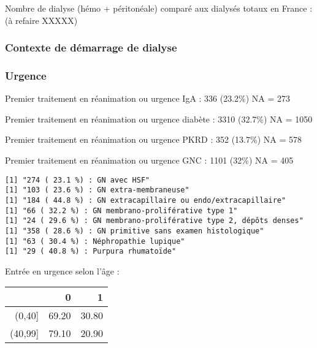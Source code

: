 \documentclass[11pt,a4paper]{article}\usepackage[]{graphicx}\usepackage[]{color}
\makeatletter
\newenvironment{kframe}{%
 \def\at@end@of@kframe{}%
 \ifinner\ifhmode%
  \def\at@end@of@kframe{\end{minipage}}%
  \begin{minipage}{\columnwidth}%
 \fi\fi%
 \def\FrameCommand##1{\hskip\@totalleftmargin \hskip-\fboxsep
 \colorbox{shadecolor}{##1}\hskip-\fboxsep
     \hskip-\linewidth \hskip-\@totalleftmargin \hskip\columnwidth}%
 \MakeFramed {\advance\hsize-\width
   \@totalleftmargin\z@ \linewidth\hsize
   \@setminipage}}%
 {\par\unskip\endMakeFramed%
 \at@end@of@kframe}
\newenvironment{knitrout}{}{} %
\makeatother
\begin{document}

Nombre de dialyse (hémo + péritonéale) comparé aux dialysés totaux en France : (à refaire XXXXX)



    \subsubsection{Contexte de démarrage de dialyse}

  \subsubsection*{Urgence}



    
Premier traitement en réanimation ou urgence IgA :  336 (23.2\%) NA = 273

Premier traitement en réanimation ou urgence diabète :  3310 (32.7\%) NA = 1050

Premier traitement en réanimation ou urgence PKRD :  352 (13.7\%) NA = 578

Premier traitement en réanimation ou urgence GNC :  1101 (32\%) NA = 405

\begin{knitrout}
\color{fgcolor}\begin{kframe}
\begin{verbatim}
[1] "274 ( 23.1 %) : GN avec HSF"
[1] "103 ( 23.6 %) : GN extra-membraneuse"
[1] "184 ( 44.8 %) : GN extracapillaire ou endo/extracapillaire"
[1] "66 ( 32.2 %) : GN membrano-proliférative type 1"
[1] "24 ( 29.6 %) : GN membrano-proliférative type 2, dépôts denses"
[1] "358 ( 28.6 %) : GN primitive sans examen histologique"
[1] "63 ( 30.4 %) : Néphropathie lupique"
[1] "29 ( 40.8 %) : Purpura rhumatoïde"
\end{verbatim}
\end{kframe}
\end{knitrout}

Entrée en urgence selon l'âge :

\begin{table}[H]
\centering
\begin{tabular}{rrr}
  \hline
 & 0 & 1 \\ 
  \hline
(0,40] & 69.20 & 30.80 \\ 
  (40,99] & 79.10 & 20.90 \\ 
   \hline
\end{tabular}
\end{table}
\end{document}
